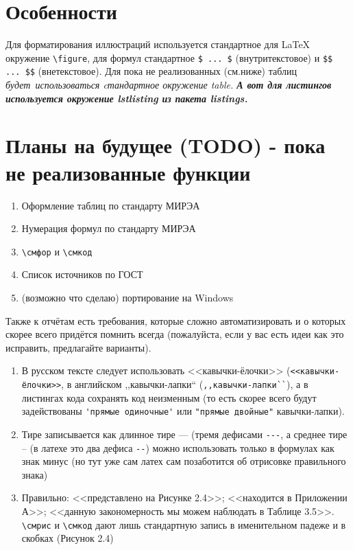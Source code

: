 \documentclass{article}
\begin{document}
\section{Особенности}
Для форматирования иллюстраций используется стандартное для LaTeX окружение \verb|\figure|, для формул стандартное \verb|$ ... $| (внутритекстовое) и \verb|$$ ... $$| (внетекстовое).
Для пока не реализованных (см.ниже) %
таблиц \it будет\rm~использоваться cтандартное окружение table. \bf А вот для листингов используется окружение lstlisting из пакета listings.\rm
\section{Планы на будущее (TODO) - пока не реализованные функции}
\begin{enumerate}
	\item Оформление таблиц по стандарту МИРЭА
	\item Нумерация формул по стандарту МИРЭА
	\item \verb|\смфор| и \verb|\смкод|
	\item Список источников по ГОСТ
	\item (возможно что сделаю) портирование на Windows
\end{enumerate}

Также к отчётам есть требования, которые сложно автоматизировать и о которых скорее всего придётся помнить всегда (пожалуйста, если у вас есть идеи как это исправить, предлагайте варианты).
\begin{enumerate}
\item В русском тексте следует использовать <<кавычки-ёлочки>> (\verb|<<кавычки-ёлочки>>|, в английском ,,кавычки-лапки`` (\verb|,,кавычки-лапки``|), а в листингах кода сохранять код неизменным (то есть скорее всего будут задействованы \verb|'прямые одиночные'| или \verb|"прямые двойные"| кавычки-лапки).
\item Тире записывается как длинное тире --- (тремя дефисами \verb|---|, а среднее тире -- (в латехе это два дефиса \verb|--|) можно использовать только в формулах как знак минус (но тут уже сам латех сам позаботится об отрисовке правильного знака)
\item Правильно: <<представлено на Рисунке 2.4>>; <<находится в Приложении А>>; <<данную закономерность мы можем наблюдать в Таблице 3.5>>. \verb|\смрис| и \verb|\смкод| дают лишь стандартную запись в именительном падеже и в скобках (Рисунок 2.4)
\end{enumerate}
\end{document}
